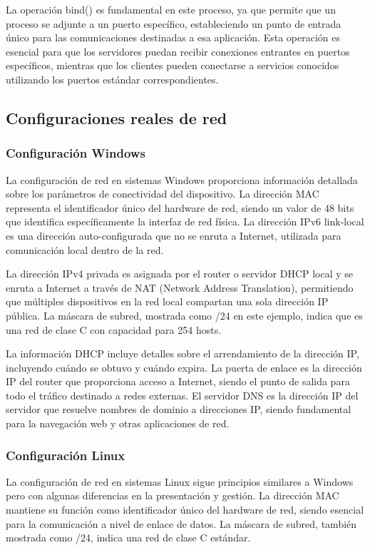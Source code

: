 \begin{itemize}
La operación bind() es fundamental en este proceso, ya que permite que un proceso se adjunte a un puerto específico, estableciendo un punto de entrada único para las comunicaciones destinadas a esa aplicación. Esta operación es esencial para que los servidores puedan recibir conexiones entrantes en puertos específicos, mientras que los clientes pueden conectarse a servicios conocidos utilizando los puertos estándar correspondientes.

\subsection{Configuraciones reales de red}

\subsubsection{Configuración Windows}

La configuración de red en sistemas Windows proporciona información detallada sobre los parámetros de conectividad del dispositivo. La dirección MAC representa el identificador único del hardware de red, siendo un valor de 48 bits que identifica específicamente la interfaz de red física. La dirección IPv6 link-local es una dirección auto-configurada que no se enruta a Internet, utilizada para comunicación local dentro de la red.

La dirección IPv4 privada es asignada por el router o servidor DHCP local y se enruta a Internet a través de NAT (Network Address Translation), permitiendo que múltiples dispositivos en la red local compartan una sola dirección IP pública. La máscara de subred, mostrada como /24 en este ejemplo, indica que es una red de clase C con capacidad para 254 hosts.

La información DHCP incluye detalles sobre el arrendamiento de la dirección IP, incluyendo cuándo se obtuvo y cuándo expira. La puerta de enlace es la dirección IP del router que proporciona acceso a Internet, siendo el punto de salida para todo el tráfico destinado a redes externas. El servidor DNS es la dirección IP del servidor que resuelve nombres de dominio a direcciones IP, siendo fundamental para la navegación web y otras aplicaciones de red.

\subsubsection{Configuración Linux}

La configuración de red en sistemas Linux sigue principios similares a Windows pero con algunas diferencias en la presentación y gestión. La dirección MAC mantiene su función como identificador único del hardware de red, siendo esencial para la comunicación a nivel de enlace de datos. La máscara de subred, también mostrada como /24, indica una red de clase C estándar.


\end{itemize}
